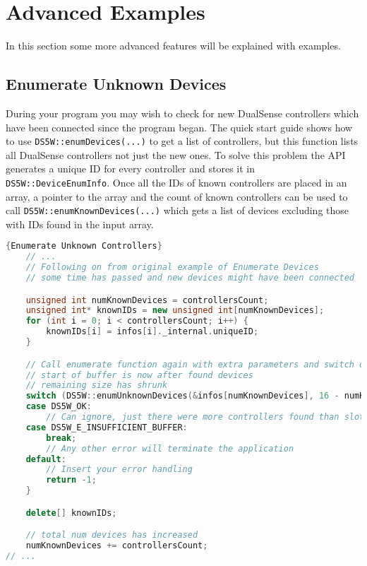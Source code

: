 \section{Advanced Examples}
In this section some more advanced features will be explained with examples.

\subsection{Enumerate Unknown Devices}
During your program you may wish to check for new DualSense controllers which have been connected since the program began. The quick start guide shows how to use \texttt{DS5W::enumDevices(...)} to get a list of controllers, but this function lists all DualSense controllers not just the new ones. To solve this problem the API generates a unique ID for every controller and stores it in \texttt{DS5W::DeviceEnumInfo}. Once all the IDs of known controllers are placed in an array, a pointer to the array and the count of known controllers can be used to call \texttt{DS5W::enumKnownDevices(...)} which gets a list of devices excluding those with IDs found in the input array.

\begin{minipage}{\textwidth}
\begin{lstlisting}[language=C++,label=advcode1,caption={Enumerate Unknown Controllers}]{Enumerate Unknown Controllers}
	// ...
	// Following on from original example of Enumerate Devices
	// some time has passed and new devices might have been connected

	unsigned int numKnownDevices = controllersCount;
	unsigned int* knownIDs = new unsigned int[numKnownDevices];
	for (int i = 0; i < controllersCount; i++) {
		knownIDs[i] = infos[i]._internal.uniqueID;
	}

	// Call enumerate function again with extra parameters and switch on return value
	// start of buffer is now after found devices
	// remaining size has shrunk
	switch (DS5W::enumUnknownDevices(&infos[numKnownDevices], 16 - numKnownDevices, knownIDs, numKnownDevices, &controllersCount)) {
	case DS5W_OK:
		// Can ignore, just there were more controllers found than slots in the buffer
	case DS5W_E_INSUFFICIENT_BUFFER:
		break;
		// Any other error will terminate the application
	default:
		// Insert your error handling
		return -1;
	}

    delete[] knownIDs;

	// total num devices has increased
	numKnownDevices += controllersCount;
// ...
\end{lstlisting}
\end{minipage}

